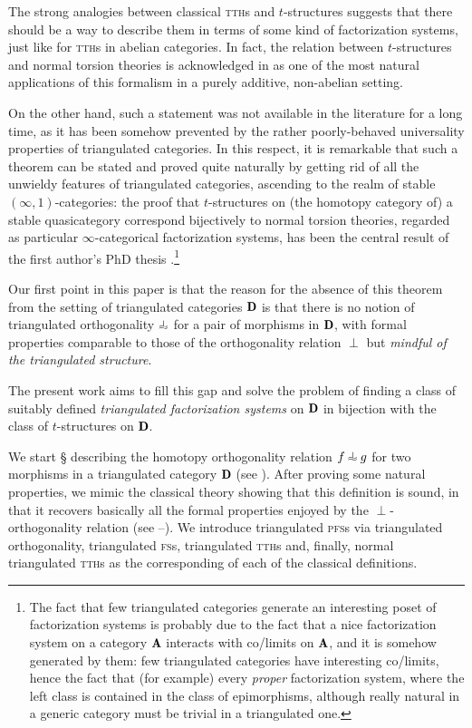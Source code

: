 The strong analogies between classical \textsc{tth}s and $t$-structures suggests that there should be a way to describe them in terms of some kind of factorization systems, just like for \textsc{tth}s in abelian categories. In fact, the relation between $t$-structures and normal torsion theories is acknowledged in \cite{rosicky2007factorization} as one of the most natural applications of this formalism in a purely additive, non-abelian setting.

On the other hand, such a statement was not available in the literature for a long time, as it has been somehow prevented by the rather poorly\hyp{}behaved universality properties of triangulated categories. In this respect, it is remarkable that such a theorem can be stated and proved quite naturally by getting rid of all the unwieldy features of triangulated categories, ascending to the realm of stable $(\infty,1)$\hyp{}categories: the proof that $t$-structures on (the homotopy category of) a stable quasicategory correspond bijectively to normal torsion theories, regarded as particular $\infty$\hyp{}categorical factorization systems, has been the central result of the first author's PhD thesis \cite{tstructures}.\footnote{The fact that few triangulated categories generate an interesting poset of factorization systems is probably due to the fact that a nice factorization system on a category $\cate{A}$ interacts with co/limits on $\cate{A}$, and it is somehow generated by them: few triangulated categories have interesting co/limits, hence the fact that (for example) every \emph{proper} factorization system, where the left class is contained in the class of epimorphisms, although really natural in a generic category must be trivial in a triangulated one.}

Our first point in this paper is that the reason for the absence of this theorem from the setting of triangulated categories $\cD$ is that there is no notion of triangulated orthogonality $\horth$ for a pair of morphisms in $\cD$, with formal properties comparable to those of the orthogonality relation $\perp$ but \emph{mindful of the triangulated structure}.

The present work aims to fill this gap and solve the problem of finding a class of suitably defined \emph{triangulated factorization systems} on $\cD$ in bijection with the class of $t$-structures on $\cD$.

We start § describing the homotopy orthogonality relation $f\horth g$ for two morphisms in a triangulated category $\cD$ (see \adef{}). After proving some natural properties, we mimic the classical theory showing that this definition is sound, in that it recovers basically all the formal properties enjoyed by the $\perp$-orthogonality relation (see --). We introduce triangulated \textsc{pfs}s via triangulated orthogonality, triangulated \textsc{fs}s, triangulated \textsc{tth}s and, finally, normal triangulated \textsc{tth}s as the corresponding of each of the classical definitions.

